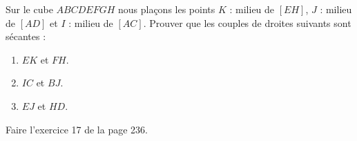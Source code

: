
\begin{exercice}\label{exosmath-0524}

    Sur le cube \( ABCDEFGH\) nous plaçons les points \( K\) : milieu de \( [EH]\), \( J\) : milieu de \( [AD]\) et \( I\) : milieu de \( [AC]\). Prouver que les couples de droites suivants sont sécantes :
    \begin{enumerate}
        \item
            \( EK\) et \( FH\).
        \item
            \( IC\) et \( BJ\).
        \item
            \( EJ\) et \( HD\).
    \end{enumerate}

Faire l'exercice 17 de la page 236.

\end{exercice}
